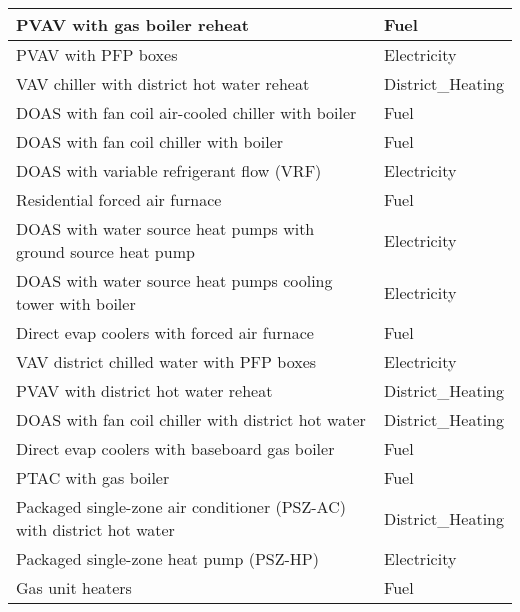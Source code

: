 \begin{table}[hb!]
\begin{tabular}{|l|l|}
PVAV with gas boiler reheat                                 & Fuel                           \\ \hline
PVAV with PFP boxes                                         & Electricity                    \\ \hline
VAV chiller with district hot water reheat                  & District\_Heating              \\ \hline
DOAS with fan coil air-cooled chiller with boiler           & Fuel                           \\ \hline
DOAS with fan coil chiller with boiler                      & Fuel                           \\ \hline
DOAS with variable refrigerant flow (VRF)                                               & Electricity                    \\ \hline
Residential forced air furnace                              & Fuel                           \\ \hline
DOAS with water source heat pumps with ground source heat pump    & Electricity              \\ \hline
DOAS with water source heat pumps cooling tower with boiler & Electricity                    \\ \hline
Direct evap coolers with forced air furnace                 & Fuel                           \\ \hline
VAV district chilled water with PFP boxes                   & Electricity                    \\ \hline
PVAV with district hot water reheat                         & District\_Heating              \\ \hline
DOAS with fan coil chiller with district hot water          & District\_Heating              \\ \hline
Direct evap coolers with baseboard gas boiler               & Fuel                           \\ \hline
PTAC with gas boiler                                        & Fuel                           \\ \hline
Packaged single-zone air conditioner (PSZ-AC) with district hot water                              & District\_Heating              \\ \hline
Packaged single-zone heat pump (PSZ-HP)                                                      & Electricity                    \\ \hline
Gas unit heaters                                            & Fuel                           \\ \hline

\end{tabular}
\end{table}
